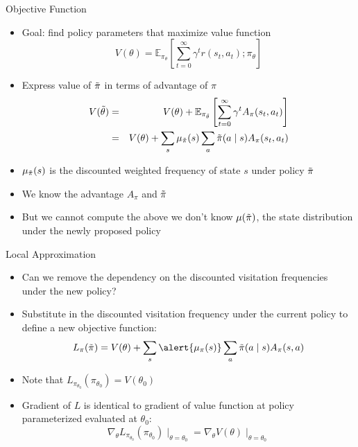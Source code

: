 \documentclass[aspectratio=169]{../latex_main/tntbeamer}  %
\begin{document}
\begin{frame}[c]{Objective Function}
	\vspace{-1em}
    \begin{itemize}
        \item Goal: find policy parameters that maximize value function
        $$ V(\theta) = \mathbb{E}_{\pi_\theta} \left[ \sum_{t=0}^{\infty} \gamma^t r(s_t, a_t); \pi_\theta \right]$$
        \item Express value of $\Tilde{\pi}$ in terms of advantage of $\pi$
        \begin{eqnarray}
        V(\Tilde{\theta}) &=& V(\theta) + \mathbb{E}_{\pi_{\Tilde{\theta}}} \left[ \sum_{t=0}^{\infty} \gamma^t A_\pi(s_t, a_t) \right]\\
        &=& V(\theta) + \sum_{s} \mu_{\Tilde{\pi}}(s) \sum_{a} \Tilde{\pi}(a \mid s) A_\pi(s_t, a_t) 
        \end{eqnarray}
        \item $ \mu_{\Tilde{\pi}}(s)$ is the discounted weighted frequency of state $s$ under policy $\Tilde{\pi}$
        \item We know the advantage $A_\pi$ and $\Tilde{\pi}$
        \item But we cannot compute the above we don't know $\mu(\Tilde{\pi})$, the state distribution under the newly proposed policy
    \end{itemize}

\end{frame}
\begin{frame}[c]{Local Approximation}
	
    \begin{itemize}
        \item Can we remove the dependency on the discounted visitation frequencies under the new policy?
        \item Substitute in the discounted visitation frequency under the current policy to define a new objective function:
        $$ L_\pi(\Tilde{\pi}) = V(\theta) + \sum_{s} \alert{\mu_\pi (s)} \sum_{a} \Tilde{\pi}(a \mid s) A_\pi(s,a)$$
        \item Note that $L_{\pi_{\theta_0}}(\pi_{\theta_0}) = V(\theta_0)$
        \item Gradient of $L$ is identical to gradient of value function at policy parameterized evaluated at $\theta_0$: 
        $$\nabla_{\theta} L_{\pi_{\theta_0}}(\pi_{\theta_0})\mid_{\theta = \theta_0} = \nabla_\theta V(\theta)\mid_{\theta = \theta_0}$$
    \end{itemize}

\end{frame}
\end{document}
